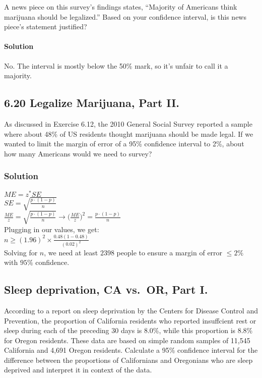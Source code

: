 \documentclass[]{article}
\let\oldparagraph\paragraph
\renewcommand{\paragraph}[1]{\oldparagraph{#1}\mbox{}}
\begin{document}
A news piece on this survey's findings states, ``Majority of Americans
think marijuana should be legalized.'' Based on your confidence
interval, is this news piece's statement justified?

\paragraph{Solution}\label{solution-7}

No. The interval is mostly below the 50\% mark, so it's unfair to call
it a majority.

\subsection{6.20 Legalize Marijuana, Part
II.}\label{legalize-marijuana-part-ii.}

As discussed in Exercise 6.12, the 2010 General Social Survey reported a
sample where about 48\% of US residents thought marijuana should be made
legal. If we wanted to limit the margin of error of a 95\% confidence
interval to 2\%, about how many Americans would we need to survey?

\subsubsection{Solution}\label{solution-8}

\(ME = z^* SE\)\\
\(SE = \sqrt{\frac{p\cdot(1-p)}{n}}\)\\
\(\frac{ME}{z} = \sqrt{\frac{p\cdot(1-p)}{n}} \to \Big(\frac{ME}{z}\Big)^2 = \frac{p\cdot(1-p)}{n}\)\\
Plugging in our values, we get:\\
\(n \geq (1.96)^2\times\frac{0.48(1-0.48)}{(0.02)^2}\)\\
Solving for \(n\), we need at least \(2398\) people to ensure a margin
of error \(\leq 2\%\) with \(95\%\) confidence.

\subsection{Sleep deprivation, CA vs.~OR, Part
I.}\label{sleep-deprivation-ca-vs.or-part-i.}

According to a report on sleep deprivation by the Centers for Disease
Control and Prevention, the proportion of California residents who
reported insuffcient rest or sleep during each of the preceding 30 days
is 8.0\%, while this proportion is 8.8\% for Oregon residents. These
data are based on simple random samples of 11,545 California and 4,691
Oregon residents. Calculate a 95\% confidence interval for the
difference between the proportions of Californians and Oregonians who
are sleep deprived and interpret it in context of the data.
\end{document}
